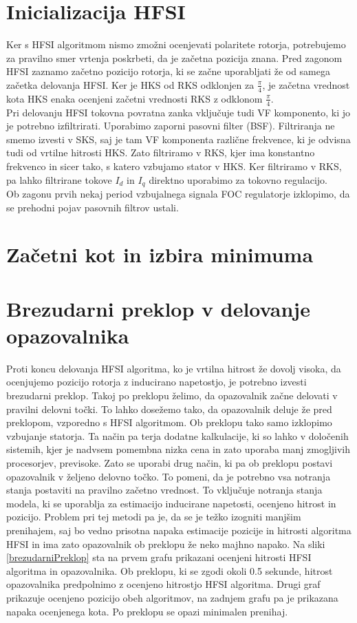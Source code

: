 \documentclass[a4paper,twoside,openright,12pt,slovene]{book}
\begin{document}
\section{Inicializacija HFSI}

Ker s HFSI algoritmom nismo zmožni ocenjevati polaritete rotorja, potrebujemo za pravilno smer vrtenja poskrbeti, da je začetna pozicija znana. Pred zagonom HFSI zaznamo začetno pozicijo rotorja, ki
se začne uporabljati že od samega začetka delovanja HFSI. Ker je HKS od RKS odklonjen za $\frac{\pi}{4}$, je začetna vrednost kota HKS enaka ocenjeni začetni vrednosti RKS z odklonom $\frac{\pi}{4}$.
\\
Pri delovanju HFSI tokovna povratna zanka vključuje tudi VF komponento, ki jo je potrebno izfiltrirati. Uporabimo zaporni pasovni filter (BSF). Filtriranja ne smemo izvesti v SKS, saj je tam VF
komponenta različne frekvence, ki je odvisna tudi od vrtilne hitrosti HKS. Zato filtriramo v RKS, kjer ima konstantno frekvenco in sicer tako, s katero vzbujamo stator v HKS. Ker filtriramo v RKS, pa
lahko filtrirane tokove $I_d$ in $I_q$ direktno uporabimo za tokovno regulacijo. 
\\
Ob zagonu prvih nekaj period vzbujalnega signala FOC regulatorje izklopimo, da se prehodni pojav pasovnih filtrov ustali. 

\section{Začetni kot in izbira minimuma}

\section{Brezudarni preklop v delovanje opazovalnika}

Proti koncu delovanja HFSI algoritma, ko je vrtilna hitrost že dovolj visoka, da ocenjujemo pozicijo rotorja z inducirano napetostjo, je potrebno izvesti brezudarni preklop. Takoj po preklopu želimo,
da opazovalnik začne delovati v pravilni delovni točki. To lahko dosežemo tako, da opazovalnik deluje že pred preklopom, vzporedno s HFSI algoritmom. Ob preklopu tako samo izklopimo vzbujanje
statorja. Ta način pa terja dodatne kalkulacije, ki so lahko v določenih sistemih, kjer je nadvsem pomembna nizka cena in zato uporaba manj zmogljivih procesorjev, previsoke. Zato se uporabi drug
način, ki pa ob preklopu postavi opazovalnik v željeno delovno točko. To pomeni, da je potrebno vsa notranja stanja postaviti na pravilno začetno vrednost. To vključuje notranja stanja modela, ki se
uporablja za estimacijo inducirane napetosti, ocenjeno hitrost in pozicijo. Problem pri tej metodi pa je, da se je težko izogniti manjšim prenihajem, saj bo vedno prisotna napaka estimacije
pozicije in hitrosti algoritma HFSI in ima zato opazovalnik ob preklopu že neko majhno napako. Na sliki \ref{brezudarniPreklop} sta na prvem grafu prikazani ocenjeni hitrosti HFSI algoritma in
opazovalnika. Ob preklopu, ki se zgodi okoli 0.5 sekunde, hitrost opazovalnika predpolnimo z ocenjeno hitrostjo HFSI algoritma. Drugi graf prikazuje ocenjeno pozicijo obeh algoritmov, na zadnjem grafu
pa je prikazana napaka ocenjenega kota. Po preklopu se opazi minimalen prenihaj.
\end{document}
